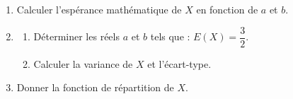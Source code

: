 \documentclass[11pt]{article}
\begin{document}
\begin{enumerate}
  \item Calculer l'espérance mathématique de $X$ en fonction de $a$ et $b$.
  \item \begin{enumerate}[label=\alph*.]
    \item Déterminer les réels $a$ et $b$ tels que : $E(X) = \dfrac{3}{2}$.
    \item Calculer la variance de $X$ et l'écart-type.
  \end{enumerate}
  \item Donner la fonction de répartition de $X$.
\end{enumerate}
\end{document}
